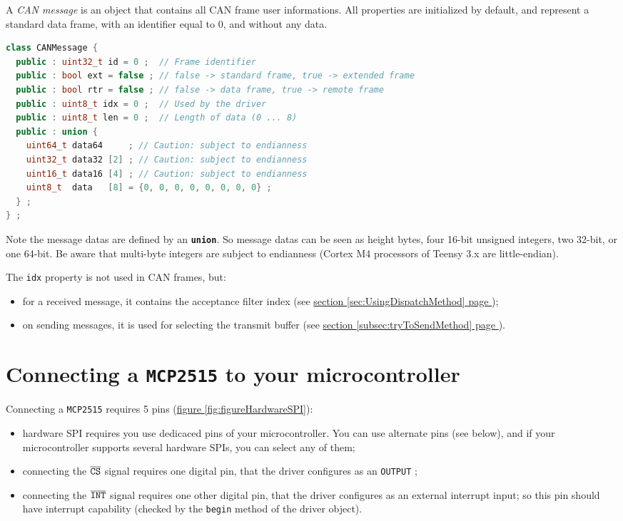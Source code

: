 \documentclass[9pt, a4paper, obeyspaces]{extarticle}
\newcommand\refSectionPage[1]{\hyperref[sec:#1]{section \ref*{sec:#1} page \pageref{sec:#1}}}
\newcommand\refSubsectionPage[1]{\hyperref[subsec:#1]{section \ref*{subsec:#1} page \pageref{subsec:#1}}}
\newcommand\refFigure[2]{\hyperref[fig:#2]{figure \ref*{fig:#2}{\ifthenelse{\equal{#1}{}}{}{.#1}}}}
\begin{document}
A \emph{CAN message} is an object that contains all CAN frame user informations. All properties are initialized by default, and represent a standard data frame, with an identifier equal to $0$, and without any data.

{ \small\begin{lstlisting}[language=c++]
class CANMessage {
  public : uint32_t id = 0 ;  // Frame identifier
  public : bool ext = false ; // false -> standard frame, true -> extended frame
  public : bool rtr = false ; // false -> data frame, true -> remote frame
  public : uint8_t idx = 0 ;  // Used by the driver
  public : uint8_t len = 0 ;  // Length of data (0 ... 8)
  public : union {
    uint64_t data64     ; // Caution: subject to endianness
    uint32_t data32 [2] ; // Caution: subject to endianness
    uint16_t data16 [4] ; // Caution: subject to endianness
    uint8_t  data   [8] = {0, 0, 0, 0, 0, 0, 0, 0} ;
  } ;
} ;
\end{lstlisting}}

Note the message datas are defined by an {\bf\texttt{union}}. So message datas can be seen as height bytes, four 16-bit unsigned integers, two 32-bit, or one 64-bit. Be aware that multi-byte integers are subject to endianness (Cortex M4 processors of Teensy 3.x are little-endian).

The \texttt{idx} property is not used in CAN frames, but:
\begin{itemize}
  \item for a received message, it contains the acceptance filter index (see \refSectionPage{UsingDispatchMethod});
  \item on sending messages, it is used for selecting the transmit buffer (see \refSubsectionPage{tryToSendMethod}).
\end{itemize}









\section{Connecting a \texttt{MCP2515} to your microcontroller}


Connecting a \texttt{MCP2515} requires 5 pins (\refFigure{}{figureHardwareSPI}):
\begin{itemize}
  \item hardware SPI requires you use dedicaced pins of your microcontroller. You can use alternate pins (see below), and if your microcontroller supports several hardware SPIs, you can select any of them;
  \item connecting the $\overline{\tt CS}$ signal requires one digital pin, that the driver configures as an \texttt{OUTPUT} ;
  \item connecting the $\overline{\tt INT}$ signal requires one other digital pin, that the driver configures as an external interrupt input; so this pin should have interrupt capability (checked by the \texttt{begin} method of the driver object).
\end{itemize}
\end{document}
